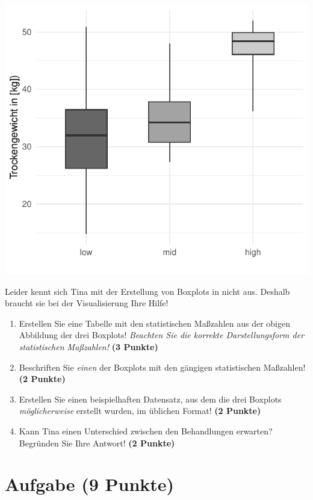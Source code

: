 \documentclass[a4paper, 9pt]{scrartcl}\usepackage[]{graphicx}\usepackage[]{xcolor}
\makeatletter
\def\maxwidth{ %
  \ifdim\Gin@nat@width>\linewidth
    \linewidth
  \else
    \Gin@nat@width
  \fi
}
\makeatother
\begin{document}
{\centering \includegraphics[width=\maxwidth]{img/boxplot-02-zer-1} 

}




Leider kennt sich Tina mit der Erstellung von Boxplots in \Rlogo nicht aus. Deshalb braucht sie bei der Visualisierung Ihre Hilfe!

\begin{enumerate}
\item Erstellen Sie eine Tabelle mit den statistischen Maßzahlen aus der obigen Abbildung der drei Boxplots! \textit{Beachten Sie die korrekte Darstellungsform der statistischen Maßzahlen!} \textbf{(3 Punkte)}
\item Beschriften Sie \textit{einen} der Boxplots mit den gängigen statistischen Maßzahlen! \textbf{(2 Punkte)}
\item Erstellen Sie einen beispielhaften Datensatz, aus dem die drei Boxplots \textit{möglicherweise} erstellt wurden, im \Rlogo üblichen Format! \textbf{(2 Punkte)}
\item Kann Tina einen Unterschied zwischen den Behandlungen erwarten? Begründen Sie Ihre Antwort! \textbf{(2 Punkte)}
\end{enumerate} 
\clearpage

\section{Aufgabe \hfill (9 Punkte)}
\end{document}
